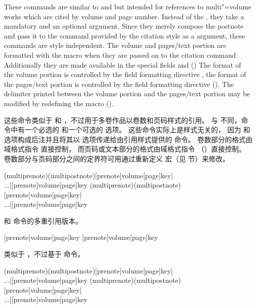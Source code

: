\begin{ltxsyntax}
These commands are similar to  and  but intended for references to multi"=volume works which are cited by volume and page number. Instead of the , they take a mandatory  and an optional  argument. Since they merely compose the postnote and pass it to the  command provided by the citation style as a  argument, these commands are style independent. The volume and pages/text portion are formatted with the macro  when they are passed on to the citation command. Additionally they are made available in the special fields  and  () The format of the volume portion is controlled by the field formatting directive , the format of the pages/text portion is controlled by the field formatting directive  (). The delimiter printed between the volume portion and the pages/text portion may be modified by redefining the macro  ().


这些命令类似于  和 ，不过用于多卷作品以卷数和页码样式的引用。
与  不同，命令中有一个必选的  和一个可选的  选项。
这些命令实际上是样式无关的，
因为  和  选项构成后注并且将其以  选项传递给由引用样式提供的  命令。
卷数部分的格式由域格式指令  直接控制，
而页码或文本部分的格式由域格式指令  （）直接控制。
卷数部分与页码部分之间的定界符可用通过重新定义  宏（见  节）来修改。

(multiprenote)(multipostnote)[prenote]{volume}[page]{key}|\\...|[prenote]{volume}[page]{key}
(multiprenote)(multipostnote)[prenote]{volume}[page]{key}|\\...|[prenote]{volume}[page]{key}

 和  命令的多重引用版本。

[prenote]{volume}[page]{key}
[prenote]{volume}[page]{key}

类似于 ，不过基于  命令。

(multiprenote)(multipostnote)[prenote]{volume}[page]{key}|\\...|[prenote]{volume}[page]{key}
(multiprenote)(multipostnote)[prenote]{volume}[page]{key}|\\...|[prenote]{volume}[page]{key}


\end{ltxsyntax}
